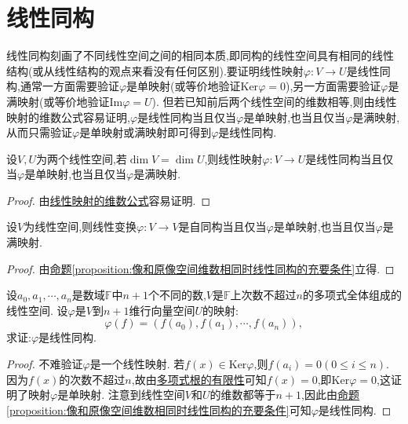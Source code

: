 \documentclass[../../main.tex]{subfiles}%
\begin{document}
\section{线性同构}
线性同构刻画了不同线性空间之间的相同本质,即同构的线性空间具有相同的线性结构(或从线性结构的观点来看没有任何区别).要证明线性映射\(\varphi:V\to U\)是线性同构,通常一方面需要验证\(\varphi\)是单映射(或等价地验证\(\text{Ker}\varphi = 0\)),另一方面需要验证\(\varphi\)是满映射(或等价地验证\(\text{Im}\varphi = U\)). 但若已知前后两个线性空间的维数相等,则由线性映射的维数公式容易证明,\(\varphi\)是线性同构当且仅当\(\varphi\)是单映射,也当且仅当\(\varphi\)是满映射,从而只需验证\(\varphi\)是单映射或满映射即可得到\(\varphi\)是线性同构.

\begin{proposition}\label{proposition:像和原像空间维数相同时线性同构的充要条件}
设$V,U$为两个线性空间,若\(\dim V = \dim U\),则线性映射\(\varphi:V\rightarrow U\)是线性同构当且仅当\(\varphi\)是单映射,也当且仅当\(\varphi\)是满映射.
\end{proposition}
\begin{proof}

由\hyperref[theorem:值域和核空间维数之和等于原像空间维数]{线性映射的维数公式}容易证明.

\end{proof}

\begin{corollary}\label{corollary:线性变换自同构的充要条件}
设$V$为线性空间,则线性变换\(\varphi:V\rightarrow V\)是自同构当且仅当\(\varphi\)是单映射,也当且仅当\(\varphi\)是满映射.
\end{corollary}
\begin{proof}

由\hyperref[proposition:像和原像空间维数相同时线性同构的充要条件]{命题\ref{proposition:像和原像空间维数相同时线性同构的充要条件}}立得.

\end{proof}

\begin{lemma}\label{lemma:证明Lagrange插值公式}
设\(a_0,a_1,\cdots,a_n\)是数域\(\mathbb{F}\)中\(n + 1\)个不同的数,\(V\)是\(\mathbb{F}\)上次数不超过\(n\)的多项式全体组成的线性空间. 设\(\varphi\)是\(V\)到\(n + 1\)维行向量空间\(U\)的映射:
\[
\varphi(f)=(f(a_0),f(a_1),\cdots,f(a_n)),
\]
求证:\(\varphi\)是线性同构.
\end{lemma}
\begin{proof}

不难验证\(\varphi\)是一个线性映射. 若\(f(x)\in\text{Ker}\varphi\),则\(f(a_i)=0(0\leqslant  i\leqslant  n)\). 因为\(f(x)\)的次数不超过\(n\),故由\hyperref[proposition:多项式根的有限性]{多项式根的有限性}可知\(f(x)=0\),即\(\text{Ker}\varphi = 0\),这证明了映射\(\varphi\)是单映射. 注意到线性空间\(V\)和\(U\)的维数都等于\(n + 1\),因此由\hyperref[proposition:像和原像空间维数相同时线性同构的充要条件]{命题\ref{proposition:像和原像空间维数相同时线性同构的充要条件}}可知\(\varphi\)是线性同构.

\end{proof}
\end{document}
